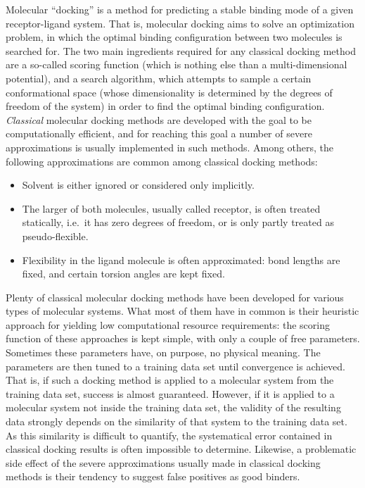 Molecular \enquote{docking} is a method for predicting a stable binding mode of
a given receptor-ligand system. That is, molecular docking aims to solve an
optimization problem, in which the optimal binding configuration between two
molecules is searched for. The two main ingredients required for any classical
docking method are a so-called scoring function (which is nothing else than a
multi-dimensional potential), and a search algorithm, which attempts to sample a
certain conformational space (whose dimensionality is determined by the degrees
of freedom of the system) in order to find the optimal binding configuration.
\textit{Classical} molecular docking methods are developed with the goal to be
computationally efficient, and for reaching this goal a number of severe
approximations is usually implemented in such methods. Among others, the
following approximations are common among classical docking methods:

\begin{itemize}
\item Solvent is either ignored or considered only implicitly.
\item The larger of both molecules, usually called receptor, is often treated
statically, i.e.\ it has zero degrees of freedom, or is only partly treated as
pseudo-flexible.
\item Flexibility in the ligand molecule is often approximated: bond lengths are
fixed, and certain torsion angles are kept fixed.
\end{itemize}

Plenty of classical molecular docking methods have been developed for various
types of molecular systems. What most of them have in common is their heuristic
approach for yielding low computational resource requirements: the scoring
function of these approaches is kept simple, with only a couple of free
parameters. Sometimes these parameters have, on purpose, no physical meaning.
The parameters are then tuned to a training data set until convergence is
achieved. That is, if such a docking method is applied to a molecular system
from the training data set, success is almost guaranteed. However, if it is
applied to a molecular system not inside the training data set, the validity of
the resulting data strongly depends on the similarity of that system to the
training data set. As this similarity is difficult to quantify, the systematical
error contained in classical docking results is often impossible to determine.
Likewise, a problematic side effect of the severe approximations usually made in
classical docking methods is their tendency to suggest false positives as good
binders.

